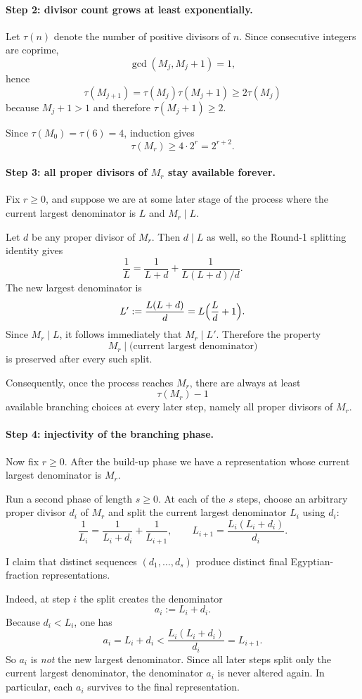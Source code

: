 \paragraph{Step 2: divisor count grows at least exponentially.}
Let $\tau(n)$ denote the number of positive divisors of $n$. Since consecutive integers are coprime,
\[
\gcd(M_j,M_j+1)=1,
\]
hence
\[
\tau(M_{j+1})=\tau(M_j)\tau(M_j+1)\ge 2\tau(M_j)
\]
because $M_j+1>1$ and therefore $\tau(M_j+1)\ge 2$.

Since $\tau(M_0)=\tau(6)=4$, induction gives
\[
\tau(M_r)\ge 4\cdot 2^r=2^{r+2}.
\]

\paragraph{Step 3: all proper divisors of $M_r$ stay available forever.}
Fix $r\ge 0$, and suppose we are at some later stage of the process where the current largest denominator is $L$ and $M_r\mid L$.

Let $d$ be any proper divisor of $M_r$. Then $d\mid L$ as well, so the Round-1 splitting identity gives
\[
\frac1L=\frac1{L+d}+\frac1{L(L+d)/d}.
\]
The new largest denominator is
\[
L':=\frac{L(L+d)}{d}=L\Bigl(\frac{L}{d}+1\Bigr).
\]
Since $M_r\mid L$, it follows immediately that $M_r\mid L'$. Therefore the property
\[
M_r \mid \mbox{(current largest denominator)}
\]
is preserved after every such split.

Consequently, once the process reaches $M_r$, there are always at least
\[
\tau(M_r)-1
\]
available branching choices at every later step, namely all proper divisors of $M_r$.

\paragraph{Step 4: injectivity of the branching phase.}
Now fix $r\ge 0$. After the build-up phase we have a representation whose current largest denominator is $M_r$.

Run a second phase of length $s\ge 0$. At each of the $s$ steps, choose an arbitrary proper divisor $d_i$ of $M_r$ and split the current largest denominator $L_i$ using $d_i$:
\[
\frac1{L_i}=\frac1{L_i+d_i}+\frac1{L_{i+1}},
\qquad
L_{i+1}=\frac{L_i(L_i+d_i)}{d_i}.
\]

I claim that distinct sequences $(d_1,\dots,d_s)$ produce distinct final Egyptian-fraction representations.

Indeed, at step $i$ the split creates the denominator
\[
a_i:=L_i+d_i.
\]
Because $d_i<L_i$, one has
\[
a_i=L_i+d_i < \frac{L_i(L_i+d_i)}{d_i}=L_{i+1}.
\]
So $a_i$ is \emph{not} the new largest denominator. Since all later steps split only the current largest denominator, the denominator $a_i$ is never altered again. In particular, each $a_i$ survives to the final representation.

